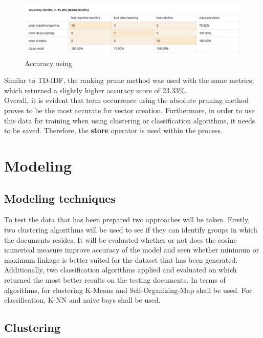 \begin{figure}[ht]
	\begin{center}
		\advance\leftskip-3cm
		\advance\rightskip-3cm
		\includegraphics[keepaspectratio=true,scale=0.6]{__resources/to.JPG}
		\caption{Accuracy using }
		\label{stop}
	\end{center}
\end{figure} 

Similar to TD-IDF, the ranking prune method was used with the same metrics, which returned a slightly higher accuracy score of 23.33\%.\\
Overall, it is evident that term occurrence using the absolute pruning method proves to be the most accurate for vector creation. Furthermore, in order to use this data for training when using clustering or classification algorithms, it needs to be saved. Therefore, the \textbf{store} operator is used within the process.




\section*{Modeling}

\subsection*{Modeling techniques}
To test the data that has been prepared two approaches will be taken. Firstly, two clustering algorithms will be used to see if they can identify groups in which the documents resides. It will be evaluated whether or not does the cosine numerical measure improve accuracy of the model and seen whether minimum or maximum linkage is better suited for the dataset that has been generated. Additionally, two classification algorithms applied and evaluated on which returned the most better results on the testing documents.
In terms of algorithms, for clustering K-Means and Self-Organizing-Map shall be used. For classification, K-NN and naive bays shall be used. 
\subsection*{Clustering}
